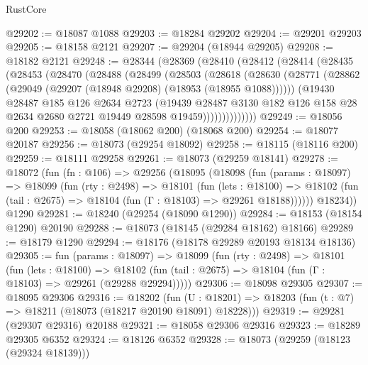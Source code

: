 \begin{lexlean}{RustCore}
\begin{coremodule}
@29202 := @18087 @1088
@29203 := @18284 @29202
@29204 := @29201 @29203
@29205 := @18158 @2121
@29207 := @29204 (@18944 @29205)
@29208 := @18182 @2121
@29248 := @28344
    (@28369
      (@28410
        (@28412
          (@28414
            (@28435
              (@28453
                (@28470
                  (@28488
                    (@28499
                      (@28503
                        (@28618
                          (@28630
                            (@28771
                              (@28862 (@29049 (@29207 (@18948 @29208) (@18953 (@18955 @1088))))))
                            (@19430
                              @28487
                              @185
                              @126
                              @2634
                              @2723
                              (@19439
                                @28487
                                @3130
                                @182
                                @126
                                @158
                                @28
                                @2634
                                @2680
                                @2721
                                @19449
                                @28598
                                @19459))))))))))))))
@29249 := @18056 @200
@29253 := @18058 (@18062 @200) (@18068 @200)
@29254 := @18077 @20187
@29256 := @18073 (@29254 @18092)
@29258 := @18115 (@18116 @200)
@29259 := @18111 @29258
@29261 := @18073 (@29259 @18141)
@29278 := @18072
    (fun (fn : @106) =>
    @29256
      (@18095
        (@18098
          (fun (params : @18097) =>
          @18099
            (fun (rty : @2498) =>
            @18101
              (fun (lets : @18100) =>
              @18102 (fun (tail : @2675) => @18104 (fun (Γ : @18103) => @29261 @18188))))))
        @18234))
    @1290
@29281 := @18240 (@29254 (@18090 @1290))
@29284 := @18153 (@18154 @1290) @20190
@29288 := @18073 (@18145 (@29284 @18162) @18166)
@29289 := @18179 @1290
@29294 := @18176 (@18178 @29289 @20193 @18134 @18136)
@29305 := fun (params : @18097) =>
  @18099
    (fun (rty : @2498) =>
    @18101
      (fun (lets : @18100) =>
      @18102 (fun (tail : @2675) => @18104 (fun (Γ : @18103) => @29261 (@29288 @29294)))))
@29306 := @18098 @29305
@29307 := @18095 @29306
@29316 := @18202
    (fun (U : @18201) => @18203 (fun (t : @7) => @18211 (@18073 (@18217 @20190 @18091) @18228)))
@29319 := @29281 (@29307 @29316) @20188
@29321 := @18058 @29306 @29316
@29323 := @18289 @29305 @6352
@29324 := @18126 @6352
@29328 := @18073 (@29259 (@18123 (@29324 @18139)))

\end{coremodule}
\end{lexlean}
